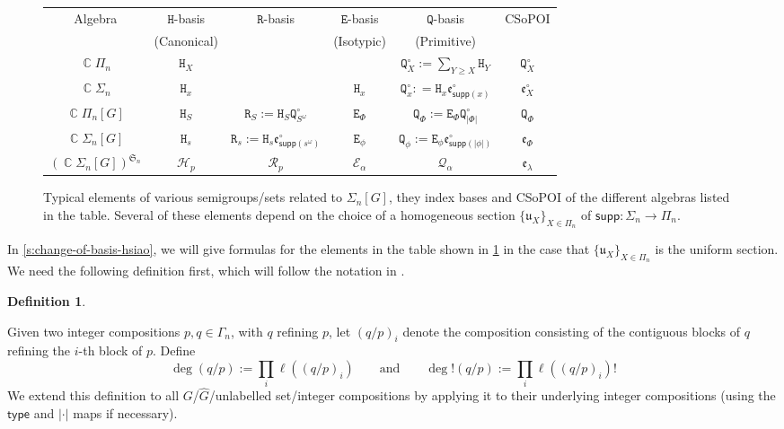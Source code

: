 \documentclass[11pt, oneside, reqno]{amsart}
\theoremstyle{definition}
\newtheorem{definition}[theorem]{Definition}
\numberwithin{equation}{section}
\DeclareMathOperator{\C}{\mathbb{C}}
\def \kk{\C}
\def \sym{\mathfrak{S}}
\def \uu{{\mathfrak{u}}}
\def \ee{{\mathfrak{e}}}
\def \wh{\widehat}
\def \gsetcomposition{{\Sigma_n[G]}}
\def \hsiao {{\gsetcomposition}}
\def \supp{\mathsf{supp}}
\def \type{\mathsf{type}}
\newcommand{\B}[1]{\mathtt{#1}} 			%
\newcommand{\SB}[1]{\mathcal{#1}} 		%
\newcommand{\abs}[1]{|{#1}|} 				%
\begin{document}
\begin{figure}[!ht]
\begin{centering}
    \begin{tabular}{cccccc}
        \toprule
        Algebra                  & $\B{H}$-basis  & $\B{R}$-basis & $\B{E}$-basis & $\B{Q}$-basis & CSoPOI \\ [-0.5ex]
                                 & \footnotesize (Canonical) & & \footnotesize (Isotypic)               & \footnotesize (Primitive)              & \\ \midrule
        $\kk \Pi_n$              & $\B{H}_X$       &                                                  &                 & $\B{Q}^\circ_X := \sum_{Y \geq X} \B{H}_Y$                      & $\B{Q}^\circ_X$     \\
        $\kk \Sigma_n$           & $\B{H}_x$       &                                                  & $\B{H}_x$       & $\B{Q}^\circ_x : = \B{H}_x \ee^\circ_{\supp(x)}$          & $\ee^\circ_X$ \\
        $\kk \Pi_n[G]$           & $\B{H}_S$       & $\B{R}_S := \B{H}_S \B{Q}^\circ_{S^\omega}$            & $\B{E}_\Phi$    & $\B{Q}_\Phi := \B{E}_\Phi \B{Q}^\circ_{\abs{\Phi}}$             & $\B{Q}_\Phi$  \\
        $\kk\hsiao$              & $\B{H}_s$       & $\B{R}_s := \B{H}_s \ee^\circ_{\supp(s^\omega)}$ & $\B{E}_\phi$    & $\B{Q}_\phi := \B{E}_\phi \ee^\circ_{\supp(\abs{\phi})}$  & $\ee_\Phi$    \\
        $(\kk\hsiao)^{\sym_n}$   & $\SB{H}_p$      & $\SB{R}_p$                                       & $\SB{E}_\alpha$ & $\SB{Q}_\alpha$                                           & $\ee_\lambda$ \\ \bottomrule
    \end{tabular} 
\end{centering}
\caption{
        Typical elements of various semigroups/sets related to $\hsiao$, they index bases and CSoPOI of the different algebras listed in the table.
        Several of these elements depend on the choice of a homogeneous section $\{\uu_X\}_{X \in \Pi_n}$ of $\supp : \Sigma_n \to \Pi_n$.}
\label{fig:notationHsiao}
\end{figure}

In \cref{s:change-of-basis-hsiao}, we will give formulas for the elements in the table shown in \cref{fig:notationHsiao} in the case that $\{\uu_X\}_{X \in \Pi_n}$ is the uniform section.
We need the following definition first, which will  follow the notation in \citep{am17}.

\begin{definition}\label{def:deg}
   
    Given two integer compositions $p,q \in \Gamma_n$, with $q$ refining $p$, let $(q/p)_i$ denote the composition consisting of the contiguous blocks of $q$ refining the $i$-th block of $p$.
    Define  
    \[
        \deg(q/p) := \prod_i \ell( (q/p)_i) \qquad\text{and}\qquad \deg!(q/p) := \prod_i \ell( (q/p)_i)!
    \]
    We extend this definition to all $G$/$\wh{G}$/unlabelled set/integer compositions by applying it to their underlying integer compositions (using the $\type$ and $\abs{\cdot}$ maps if necessary).
\end{definition}
\end{document}
